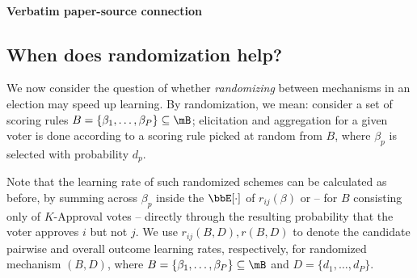 \documentclass[10pt]{article}
\begin{document}
\paragraph{Verbatim paper-source connection}
\begin{ReviewVerbatim}
\subsection{When does randomization help?}
%

%
\label{sec:randomization}

We now consider the question of whether \textit{randomizing} between mechanisms in an election may speed up learning. By randomization, we mean: consider a set of scoring rules $B = \{\beta_1, \dots, \beta_P\} \subseteq \mB$; elicitation and aggregation for a given voter is done according to a scoring rule picked at random from $B$, where $\beta_p$ is selected with probability $d_p$.

Note that the learning rate of such randomized schemes can be calculated as before, by summing across $\beta_p$ inside the $\bbE[\cdot]$ of $r_{ij}(\beta)$ or -- for $B$ consisting only of $K$-Approval votes -- directly through the resulting probability that the voter approves $i$ but not $j$. We use $r_{ij}(B,D), r(B,D)$ to denote the candidate pairwise and overall outcome learning rates, respectively, for randomized mechanism $(B,D)$, where $B = \{\beta_1, \dots, \beta_P\} \subseteq \mB$ and $D = \{d_1, \dots, d_P \}$.
\end{ReviewVerbatim}
\end{document}
